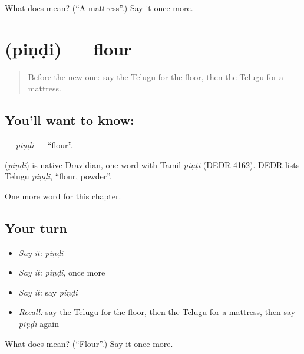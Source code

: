 \begin{tcolorbox}[breakable,colback=teal!4,colframe=teal!35!black,title={Before you move on}]
What does  mean? (\textquotedblleft{}A mattress\textquotedblright{}.) Say it once more.
\end{tcolorbox}
\section[\texorpdfstring{\te{పిండి} (piṇḍi)}{పిండి (piṇḍi)}]{ (piṇḍi) — flour}

\label{lesson:TE-C224-pindi}



\begin{quote}
Before the new one: say the Telugu for the floor, then the Telugu for a mattress.
\end{quote}

\subsection*{You'll want to know: }
\textbf{} — \emph{piṇḍi} — \textquotedblleft{}flour\textquotedblright{}.

\begin{cousinweb}
\textbf{} (\emph{piṇḍi}) is native Dravidian, one word with Tamil \emph{piṇṭi} (DEDR 4162). DEDR lists Telugu \emph{piṇḍi}, \textquotedblleft{}flour, powder\textquotedblright{}.
\end{cousinweb}

\begin{grammarlens}[title={What you've built}]
One more word for this chapter.
\end{grammarlens}

\subsection*{Your turn}
\begin{itemize}
\raggedright
  \item \emph{Say it:} \emph{piṇḍi}
  \item \emph{Say it:} \emph{piṇḍi}, once more
  \item \emph{Say it:} say \emph{piṇḍi}
  \item \emph{Recall:} say the Telugu for the floor, then the Telugu for a mattress, then say \emph{piṇḍi} again
\end{itemize}

\begin{tcolorbox}[breakable,colback=teal!4,colframe=teal!35!black,title={Before you move on}]
What does  mean? (\textquotedblleft{}Flour\textquotedblright{}.) Say it once more.
\end{tcolorbox}
